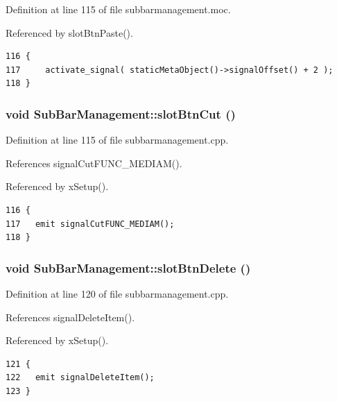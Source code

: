 Definition at line 115 of file subbarmanagement.moc.

Referenced by slot\-Btn\-Paste().



\footnotesize\begin{verbatim}116 {
117     activate_signal( staticMetaObject()->signalOffset() + 2 );
118 }
\end{verbatim}\normalsize 
{}
\subsubsection{\setlength{\rightskip}{0pt plus 5cm}void Sub\-Bar\-Management::slot\-Btn\-Cut ()\hspace{0.3cm}{\tt  [slot]}}\label{classSubBarManagement_SubBarManagementi2}




Definition at line 115 of file subbarmanagement.cpp.

References signal\-Cut\-FUNC\_\-MEDIAM().

Referenced by x\-Setup().



\footnotesize\begin{verbatim}116 {
117   emit signalCutFUNC_MEDIAM();
118 }
\end{verbatim}\normalsize 
{}
\subsubsection{\setlength{\rightskip}{0pt plus 5cm}void Sub\-Bar\-Management::slot\-Btn\-Delete ()\hspace{0.3cm}{\tt  [slot]}}\label{classSubBarManagement_SubBarManagementi3}




Definition at line 120 of file subbarmanagement.cpp.

References signal\-Delete\-Item().

Referenced by x\-Setup().



\footnotesize\begin{verbatim}121 {
122   emit signalDeleteItem();
123 }
\end{verbatim}\normalsize 
{}
